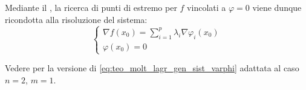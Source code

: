 \begin{samepage}
	\begin{observation}
		\label{obs:sist_eqiv_lagr}
		Mediante il , la ricerca di punti di estremo per $f$ vincolati a $\varphi = 0$ viene dunque ricondotta alla risoluzione del sistema:
		\begin{equation}
			\label{eq:teo_molt_lagr_gen_sist_varphi}
			\begin{cases}
				\nabla f(x_0) = \sum\limits_{i = 1}^{p} \lambda_i \nabla \varphi_i (x_0)\\
				\varphi(x_0) = 0
			\end{cases}
		\end{equation}
		\vspace*{-.5\baselineskip}
		\begin{note}
			Vedere  per la versione di \cref{eq:teo_molt_lagr_gen_sist_varphi} adattata al caso $n=2,\,m=1$.
		\end{note}
	\end{observation}
\end{samepage}

